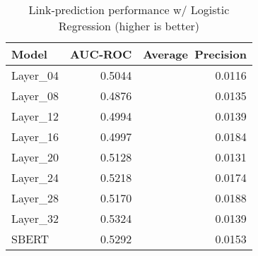 \begin{table}
\caption{Link‑prediction performance w/ Logistic Regression (higher is better)}
\label{tab:link_pred}
\begin{tabular}{lrr}
\toprule
Model & AUC‑ROC & Average Precision \\
\midrule
Layer_04 & 0.5044 & 0.0116 \\
Layer_08 & 0.4876 & 0.0135 \\
Layer_12 & 0.4994 & 0.0139 \\
Layer_16 & 0.4997 & 0.0184 \\
Layer_20 & 0.5128 & 0.0131 \\
Layer_24 & 0.5218 & 0.0174 \\
Layer_28 & 0.5170 & 0.0188 \\
Layer_32 & 0.5324 & 0.0139 \\
SBERT & 0.5292 & 0.0153 \\
\bottomrule
\end{tabular}
\end{table}
